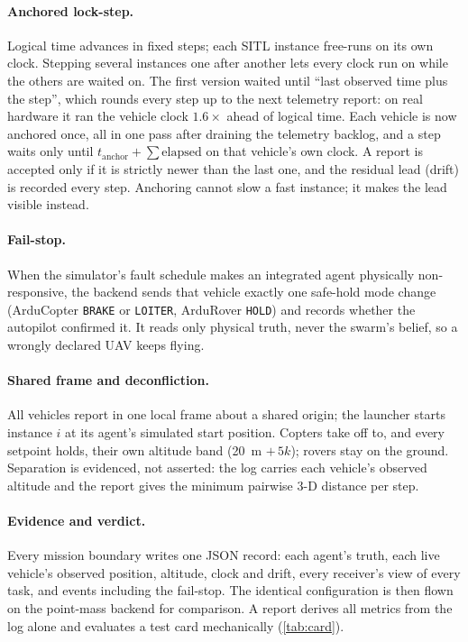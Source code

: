 \documentclass[a4paper,11pt]{article}
\newcommand{\code}[1]{\texttt{\codebreaks#1\endcodebreaks}}
\def\codebreaks{\begingroup\def\_{\textunderscore\allowbreak}\def\/{/\allowbreak}}
\def\endcodebreaks{\endgroup}
\begin{document}
\paragraph{Anchored lock-step.} Logical time advances in fixed steps; each
SITL instance free-runs on its own clock. Stepping several instances one after
another lets every clock run on while the others are waited on. The first
version waited until ``last observed time plus the step'', which rounds every
step up to the next telemetry report: on real hardware it ran the vehicle clock
$1.6\times$ ahead of logical time. Each vehicle is now anchored once, all in one
pass after draining the telemetry backlog, and a step waits only until
$t_\text{anchor} + \sum \text{elapsed}$ on that vehicle's own clock. A report is
accepted only if it is strictly newer than the last one, and the residual lead
(drift) is recorded every step. Anchoring cannot slow a fast instance; it makes
the lead visible instead.

\paragraph{Fail-stop.} When the simulator's fault schedule makes an integrated
agent physically non-responsive, the backend sends that vehicle exactly one
safe-hold mode change (ArduCopter \code{BRAKE} or \code{LOITER}, ArduRover
\code{HOLD}) and records whether the autopilot confirmed it. It reads only
physical truth, never the swarm's belief, so a wrongly declared UAV keeps
flying.

\paragraph{Shared frame and deconfliction.} All vehicles report in one local
frame about a shared origin; the launcher starts instance $i$ at its agent's
simulated start position. Copters take off to, and every setpoint holds, their
own altitude band (\SI{20}{m} $+\,5k$); rovers stay on the ground. Separation is
evidenced, not asserted: the log carries each vehicle's observed altitude and
the report gives the minimum pairwise 3-D distance per step.

\paragraph{Evidence and verdict.} Every mission boundary writes one JSON record:
each agent's truth, each live vehicle's observed position, altitude, clock and
drift, every receiver's view of every task, and events including the
fail-stop. The identical configuration is then flown on the point-mass backend
for comparison. A report derives all metrics from the log alone and evaluates a
test card mechanically (\cref{tab:card}).
\end{document}
